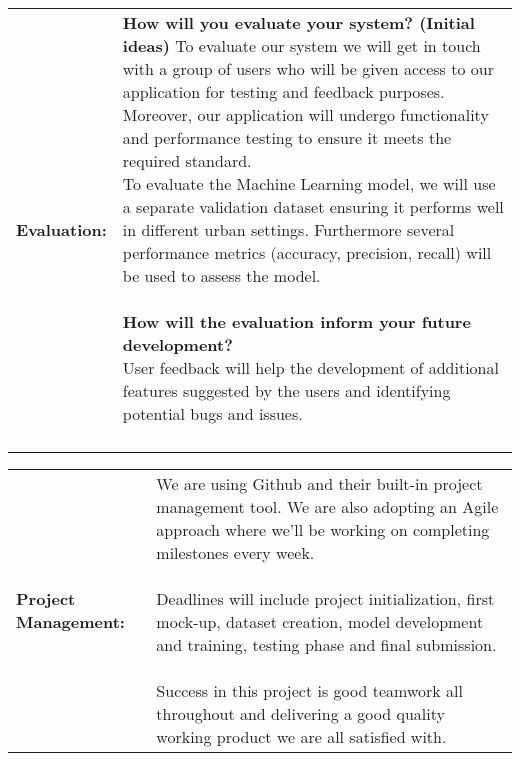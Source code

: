 \documentclass[a4paper,12pt]{article}
\begin{document}
\begin{tabular}{|p{}|p{}|}
    \hline
   \textbf{Evaluation:} & \parbox{0.65\textwidth}{\vspace{0.3cm}\textbf{How will you evaluate your system? (Initial ideas)} \vspace{0.3cm}
   To evaluate our system we will get in touch with a group of users who will be given access to our application for testing and feedback purposes. Moreover, our application will undergo functionality and performance testing to ensure it meets the required standard.
   \\
   To evaluate the Machine Learning model, we will use a separate validation dataset ensuring it performs well in different urban settings. Furthermore several performance metrics (accuracy, precision, recall) will be used to assess the model.
   \\
   \\
   \vspace{0.3cm}\textbf{ How will the evaluation inform your future development?}\vspace{0.3cm}
   \\
   User feedback will help the development of additional features suggested by the users and identifying potential bugs and issues.
   \\
   \\
    } \\
   \hline
\end{tabular}

\vspace{0.5cm}

\centering
\begin{tabular}{|p{}|p{}|}
    \hline
    \textbf{Project Management:} & \parbox{0.65\textwidth}{\vspace{0.3cm}
    We are using Github and their built-in project management tool. We are also adopting an Agile approach where we'll be working on completing milestones every week.\\ \\
    Deadlines will include project initialization, first mock-up, dataset creation, model development and training, testing phase and final submission. \\ \\
    Success in this project is good teamwork all throughout and delivering a good quality working product we are all satisfied with.
    \vspace{0.3cm}} \\
    \hline
\end{tabular}
\end{document}
